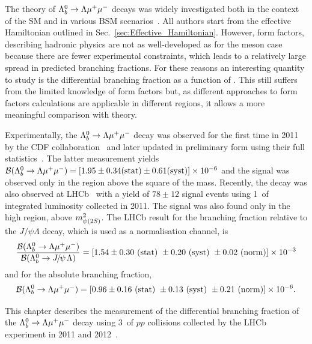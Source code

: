 The theory of ${{\Lambda}^0_{b}}\rightarrow{\ensuremath{\Lambda}}{\ensuremath{\mu^+\mu^-}}$ decays was widely investigated both in the context of the SM and in various
BSM scenarios~\cite{Aslam:2008hp,Wang:2008sm,Huang:1998ek,Chen:2001ki,Chen:2001zc,Chen:2001sj,
Zolfagharpour:2007eh,Mott:2011cx,Aliev:2010uy,Mohanta:2010eb,Sahoo:2011yb}.
All authors start from the effective Hamiltonian outlined in Sec.~\ref{sec:Effective_Hamiltonian}. 
However, form factors, describing hadronic physics are not as well-developed as for the meson case 
because there are fewer experimental constraints, which leads to a relatively
large spread in predicted branching fractions. For these reasons an interesting quantity to study is the differential 
branching fraction as a function of \qsq. This still suffers from the limited knowledge of form factors but, as different 
approaches to form factors calculations are applicable in different \qsq regions, it allows a more meaningful comparison with theory.

Experimentally, the ${{\Lambda}^0_{b}}\rightarrow{\ensuremath{\Lambda}}{\ensuremath{\mu^+\mu^-}}$ decay was observed for the first time in 2011 by the CDF 
collaboration~\cite{Aaltonen:2011qs} 
and later updated in preliminary form using their full statistics~\cite{Behari:2013xc}. 
The latter measurement yields $\mathcal{B}({{\Lambda}^0_{b}}\rightarrow{\ensuremath{\Lambda}}{\ensuremath{\mu^+\mu^-}}) =[1.95\pm0.34(\mathrm{stat})\pm0.61(\mathrm{syst})]\times 10^{-6}$ and the signal was observed only in the \qsq region above the square of the \psitwos mass.
Recently, the decay was also observed at LHCb~\cite{LHCb-PAPER-2013-025} with a yield of $78\pm12$ signal events
using 1~\invfb of integrated luminosity collected in 2011. The signal was also found only in the high \qsq region, above $m^2_{\psitwos}$.
The LHCb result for the branching fraction relative to the $J/\psi\Lambda$ decay, which is used as a normalisation channel, is 
%
\begin{equation*}
\frac{\mathcal{B}(\Lb\to\Lz\mumu)}{\mathcal{B}(\Lb\to\jpsi\Lz)}=[1.54 \pm 0.30 ~(\mathrm{stat})~ \pm 0.20 ~(\mathrm{syst})~ \pm 0.02 ~(\mathrm{norm})]\times 10^{-3} 
\end{equation*}
and for the absolute branching fraction,
\begin{equation*}
\mathcal{B}({{\Lambda}^0_{b}}\rightarrow{\ensuremath{\Lambda}}{\ensuremath{\mu^+\mu^-}}) =[0.96 \pm 0.16 ~(\mathrm{stat})~ \pm 0.13 ~(\mathrm{syst})~ \pm 0.21 ~(\mathrm{norm})]\times 10^{-6}.
\end{equation*}

This chapter describes the measurement of the differential branching fraction
of the ${{\Lambda}^0_{b}}\rightarrow{\ensuremath{\Lambda}}{\ensuremath{\mu^+\mu^-}}$ decay using 3~\invfb of $pp$ collisions collected by the LHCb experiment in 2011 and 2012~\cite{Aaij:2015xza}.

